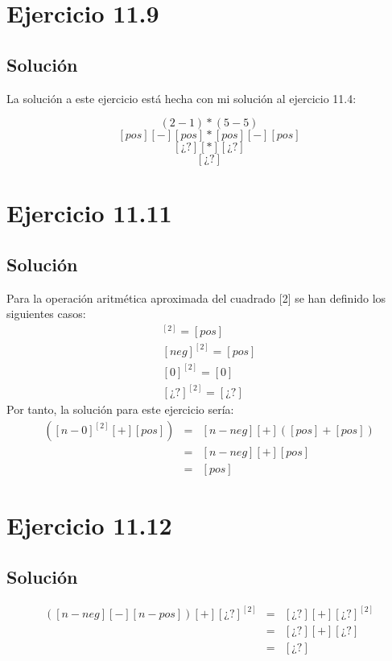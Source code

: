 \documentclass[11pt, a4paper, titlepage]{article}
\begin{document}
\section*{Ejercicio 11.9}
\subsection*{Solución}
La solución a este ejercicio está hecha con mi solución al ejercicio 11.4:

$$(2-1) * (5-5)$$
$$[pos] [-] [pos] * [pos] [-] [pos]$$
$$[¿?] [*] [¿?]$$
$$[¿?]$$

\section*{Ejercicio 11.11}
\subsection*{Solución}
Para la operación aritmética aproximada del cuadrado [2] se han definido los
siguientes casos:
\newline
\begin{align*}
  [pos]^{[2]} = [pos]\\
  [neg]^{[2]} = [pos]\\
  [0]^{[2]} = [0]\\
  [¿?]^{[2]} = [¿?]
\end{align*}
Por tanto, la solución para este ejercicio sería:
\begin{align*}
  [n-neg][+]([n-0]^{[2]}[+][pos]) & = & [n-neg][+]([pos]+[pos])
  \\
  & = & [n-neg][+][pos]
  \\
  & = &[pos]
\end{align*}
\section*{Ejercicio 11.12}
\subsection*{Solución}
\begin{align*}
  ([n-neg][−][n-pos])[+][¿?]^{[2]} & = & [¿?][+][¿?]^{[2]}
  \\
  & = & [¿?][+][¿?]
  \\
  & = & [¿?]
\end{align*}
\end{document}
